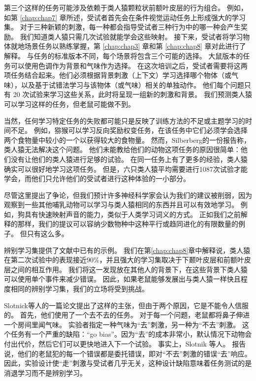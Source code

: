 第三个这样的任务可能涉及依赖于类人猿颗粒状前额叶皮层的行为组合。
例如，如第 \ref{chap:chap7} 章所述，受试者首先会在条件视觉运动任务上形成强大的学习集。
对于三种新颖的刺激，每一种都会指导受试者三种行为中的哪一种会产生奖励。
我们知道类人猿只需几次试验就能学会这些映射。
接下来，受试者将学习物体就地场景任务以熟练掌握，第 \ref{chap:chap3} 章和第 \ref{chap:chap8} 章对此进行了解释。
与任务的标准版本不同，每个场景将包含三个可能的选择。
大鼠版本的任务可以使用色调作为背景和气味作为选择。
在这次培训之后，受试者需要将这两项任务结合起来。他们必须根据背景刺激（上下文）学习选择哪个物体（或气味），以及基于试错法学习与该物体（或气味）相关的单独动作。
他们每个问题只有 20 次试验来学习这些关系，此时将呈现一组新的刺激和背景。
我们预测类人猿可以学习这样的任务，但老鼠可能做不到。
\par


当然，任何学习特定任务的失败都可能只是反映了训练方法的不足或主题学习的时间不足。
例如，猕猴可以学习反向奖励权变任务，在该任务中它们必须学会选择两个食物量中较小的一个以获得较大的食物量\cite{murray2005learning}。
然而，Silberberg\cite{silberberg1996pointing}的一份报告称，类人猿无法解决这个问题。
他们未能教给他们的动物这项任务的原因很简单：他们没有让他们的类人猿进行足够的试验。
在同一任务上有了更多的经验，类人猿确实可以很好地学习这项任务。
但是，六只类人猿平均需要进行1087次试验才能学会，而他们只允许他们的受试者进行这种体验的一小部分。
\par


尽管这里提出了争论，但我们预计许多神经科学家会认为我们的建议被削弱，因为观察到一些其他哺乳动物可以学习与类人猿相同的东西并且可以有效地学习。
例如，狗具有快速映射声音的能力，类似于人类学习词义的方式\cite{kaminski2004word}。
正如我们之前解释的那样，我们的提议可以容纳少数物种中这种平行或趋同进化的有限数量的例子。
但只有这么多。
\par


辨别学习集提供了文献中已有的示例。
我们在第\ref{chap:chap8}章中解释说，类人猿在第二次试验中的表现接近90$\%$，并且强大的学习集取决于下颞叶皮层和前额叶皮层之间的相互作用。
我们将这一发现放在其他人的背景下，在这些背景下类人猿可以使用单个事件来减少错误。
因此，如果老鼠能够发展出与类人猿一样快且程度相同的辨别学习集，我们的立场将受到挑战。
\par


Slotnick等人的一篇论文\cite{slotnick2000can}提出了这样的主张，但由于两个原因，它是不能令人信服的。
首先，他们使用了一个去不去的任务。
对于每一个问题，老鼠都将鼻子伸进一个房间里闻气味。
实验者指定一种气味为“去”刺激，另一种为“不去”刺激。
这个任务有一个严重的缺陷：“go bias”。因为“去”的成本非常小，默认情况下动物会付出代价，然后它们可以更快地进入下一个试验。
事实上，Slotnik 等人。
报告说，他们的老鼠犯的每一个错误都是委托错误，即对“不去”刺激的错误“去”响应。
因此，实验设计使“走”刺激与受试者几乎无关，这种设计缺陷意味着任务测试的是消退学习而不是辨别学习。
\par


